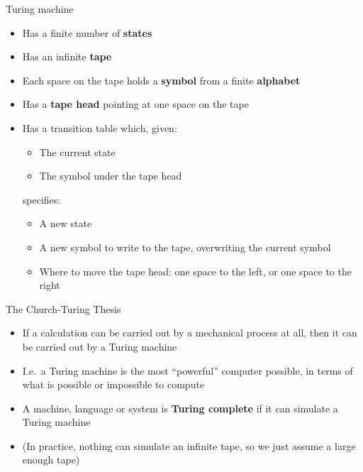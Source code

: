 \begin{frame}{Turing machine}
    \begin{itemize}
        \pause\item Has a finite number of \textbf{states}
        \pause\item Has an infinite \textbf{tape}
        \pause\item Each space on the tape holds a \textbf{symbol} from a finite \textbf{alphabet}
        \pause\item Has a \textbf{tape head} pointing at one space on the tape
        \pause\item Has a transition table which, given:
            \begin{itemize}
                \pause\item The current state
                \pause\item The symbol under the tape head
            \end{itemize}
        \pause specifies:
            \begin{itemize}
                \pause\item A new state
                \pause\item A new symbol to write to the tape, overwriting the current symbol
                \pause\item Where to move the tape head: one space to the left, or one space to the right
            \end{itemize}
    \end{itemize}
\end{frame}

\begin{frame}{The Church-Turing Thesis}
    \begin{itemize}
        \pause\item If a calculation can be carried out by a mechanical process at all,
            then it can be carried out by a Turing machine
        \pause\item I.e.\ a Turing machine is the most ``powerful'' computer possible,
            in terms of what is possible or impossible to compute
        \pause\item A machine, language or system is \textbf{Turing complete} if it can simulate a Turing machine
        \pause\item (In practice, nothing can simulate an infinite tape, so we just assume a large enough tape)
    \end{itemize}
\end{frame}

